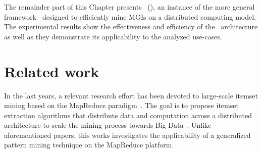 The remainder part of this Chapter presents \SeTAB\ (\SeTA ), an instance of the more general framework \Nemico\ designed to efficiently mine MGIs on a distributed computing model. 
The experimental results show the effectiveness and efficiency of the \SeTAB\ architecture as well as they demonstrate its applicability to the analyzed use-cases. 



\section{Related work}
\label{relwork}

In the last years, a relevant research effort has been devoted to large-scale itemset mining based on the MapReduce paradigm~\cite{Dean2008}. 
The goal is to propose itemset extraction algorithms that distribute data and computation across a distributed architecture to scale the mining process towards Big Data~\cite{pfpgrowth,bigfim,ISPA13}.
Unlike aforementioned papers, this works investigates the applicability of a generalized pattern mining technique on the MapReduce platform. 


